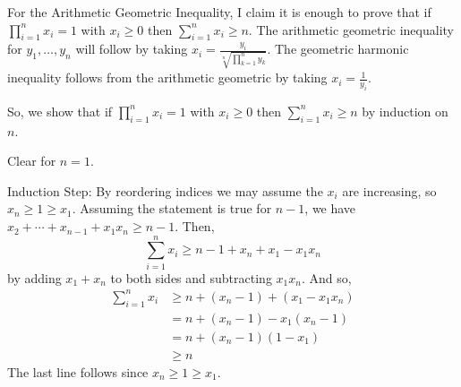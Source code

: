 \documentclass[12pt]{article}
\begin{document}
For the Arithmetic Geometric Inequality, I claim it is enough to prove that if
$\prod_{i=1}^n x_i = 1$ with $x_i \geq 0$ then $\sum_{i=1}^n x_i \geq n$. The arithmetic geometric inequality for $y_1,\ldots,y_n$ will follow by taking
$x_i = \frac{y_i}{\sqrt[n]{\prod_{k=1}^n y_k}}$. The geometric harmonic inequality follows from the arithmetic geometric by taking $x_i = \frac{1}{y_i}$.

So, we show that if $\prod_{i=1}^n x_i = 1$ with $x_i \geq 0$ then $\sum_{i=1}^n x_i \geq n$ by induction on $n$.

Clear for $n=1$.

Induction Step: By reordering indices we may assume the $x_i$ are increasing, so $x_{n} \geq 1 \geq x_1$. Assuming the statement is true for $n-1$, we have
$x_2 + \cdots + x_{n-1} + x_1x_{n} \geq n-1$. Then,
\begin{equation*} 
\sum_{i=1}^n x_i \geq n-1 + x_n + x_1-x_1x_n
\end{equation*}
 by adding $x_1+x_n$ to both sides and subtracting $x_1x_n$. And so,
\begin{align*}
\sum_{i=1}^n x_i 
&\geq n+( x_n -1)+ (x_1 -x_1 x_n) \\
&= n + (x_n - 1) - x_1 (x_n -1)\\
&= n + (x_n - 1)(1 - x_1) \\
&\geq n
\end{align*}
The last line follows since $x_n\geq 1 \geq x_1$.
\end{document}
